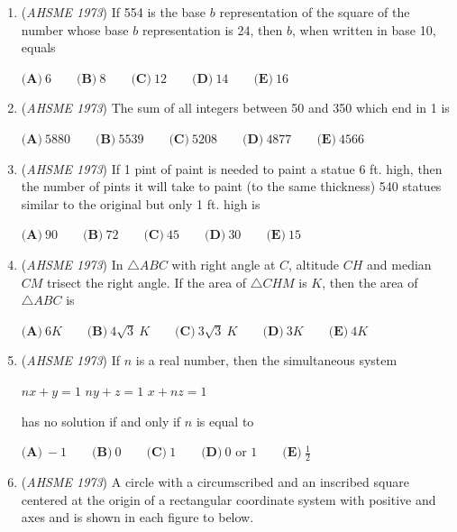 \begin{enumerate}
 $\textbf{(A)}\ \text{All}\qquad\textbf{(B)}\ \text{I and II only}\qquad\textbf{(C)}\ \text{II and III only}$
$\textbf{(D)}\ \text{II and IV only}\qquad\textbf{(E)}\ \text{II and V only}$


	\item (\textit{AHSME 1973}) If 554 is the base $b$ representation of the square of the number whose base $b$ representation is 24, then $b$, when written in base 10, equals 


 $\textbf{(A)}\ 6\qquad\textbf{(B)}\ 8\qquad\textbf{(C)}\ 12\qquad\textbf{(D)}\ 14\qquad\textbf{(E)}\ 16$


	\item (\textit{AHSME 1973}) The sum of all integers between 50 and 350 which end in 1 is 


  $\textbf{(A)}\ 5880\qquad\textbf{(B)}\ 5539\qquad\textbf{(C)}\ 5208\qquad\textbf{(D)}\ 4877\qquad\textbf{(E)}\ 4566$


	\item (\textit{AHSME 1973}) If 1 pint of paint is needed to paint a statue 6 ft. high, then the number of pints it will take to paint (to the same thickness) 540 statues similar to the original but only 1 ft. high is 


 $\textbf{(A)}\ 90\qquad\textbf{(B)}\ 72\qquad\textbf{(C)}\ 45\qquad\textbf{(D)}\ 30\qquad\textbf{(E)}\ 15$


	\item (\textit{AHSME 1973}) In  $\triangle ABC$ with right angle at $C$, altitude $CH$ and median $CM$ trisect the right angle. If the area of $\triangle CHM$ is $K$, then the area of $\triangle ABC$ is 


  $\textbf{(A)}\ 6K\qquad\textbf{(B)}\ 4\sqrt3\ K\qquad\textbf{(C)}\ 3\sqrt3\ K\qquad\textbf{(D)}\ 3K\qquad\textbf{(E)}\ 4K$


	\item (\textit{AHSME 1973}) If $n$ is a real number, then the simultaneous system 


 $nx+y = 1$
$ny+z = 1$
$x+nz = 1$


 has no solution if and only if $n$ is equal to 


 $\textbf{(A)}\ -1\qquad\textbf{(B)}\ 0\qquad\textbf{(C)}\ 1\qquad\textbf{(D)}\ 0\text{ or }1\qquad\textbf{(E)}\ \frac{1}2$


	\item (\textit{AHSME 1973}) A circle with a circumscribed and an inscribed square centered at the origin  of a rectangular coordinate system with positive  and  axes  and  is shown in each figure  to  below.



\end{enumerate}
